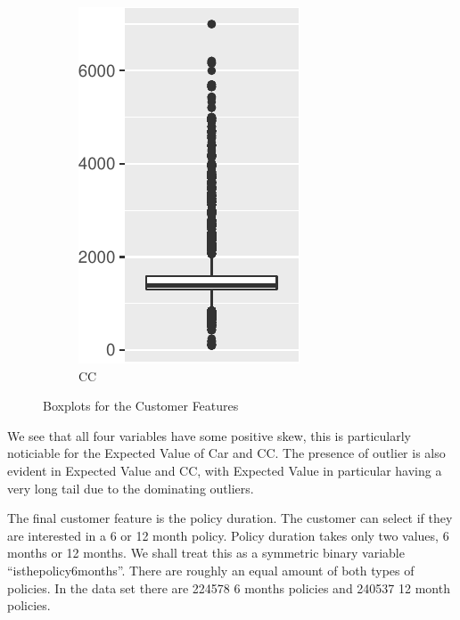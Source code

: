 \begin{figure}[H]
\begin{subfigure}{.24\textwidth}
  \includegraphics[width=\linewidth]{exploration_files/figure-latex/dist_boxplots-4.pdf}
  \caption{CC}
\end{subfigure}
\caption{Boxplots for the Customer Features}
\label{fig:boxplots_cf}
\end{figure}

We see that all four variables have some positive skew, this is particularly noticiable for the Expected Value of Car and CC. The presence of outlier is also evident in Expected Value and CC, with Expected Value in particular having a very long tail due to the dominating outliers. 


The final customer feature is the policy duration. The customer can select if they are interested in a 6 or 12 month policy. Policy duration
takes only two values, 6 months or 12 months. We shall treat this as a symmetric binary variable ``isthepolicy6months''. There are roughly an
equal amount of both types of policies. In the data set there are 224578 6 months policies and 240537 12 month policies.

